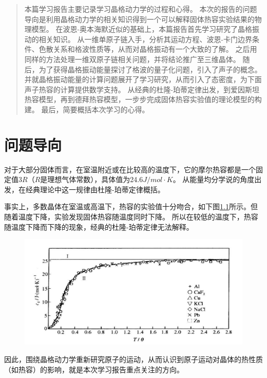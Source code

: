 \documentclass[declarePage]{ecnuthesis}
\begin{document}
\frontmatter

\begin{abstract}
本篇学习报告主要记录学习晶格动力学的过程和心得。
本次的报告的问题导向是利用晶格动力学的相关知识得到一个可以解释固体热容实验结果的物理模型。%
在波恩-奥本海默近似的基础上，本篇报告首先学习研究了晶格振动的相关知识。%
从一维单原子链入手，分析其运动方程、波恩-卡门边界条件、色散关系和格波性质等，从而对晶格振动有一个大致的了解。%
之后用同样的方法处理一维双原子链相关问题，并将结论推广至三维晶体。%
随后，为了获得晶格振动能量探讨了格波的量子化问题，引入了声子的概念。%
并就晶格振动能量的计算问题展开了学习研究，从而引入了态密度，为下面声子热容的计算提供数学支持。%
从经典的杜隆-珀蒂定律出发，到爱因斯坦热容模型，再到德拜热容模型，一步步完成固体热容实验值的理论模型的构建。%
最后，简要概括本次学习的心得。
\end{abstract}



\mainmatter

\chapter{问题导向} 

对于大部分固体而言，在室温附近或在比较高的温度下，它的摩尔热容都是一个固定值$3R$（$R$是理想气体常数），具体值为24.6$J/mol \cdot K$。%
从能量均分学说的角度出发，在经典理论中这一规律由杜隆-珀蒂定律概括。

事实上，多数晶体在室温或高温下，热容的实验值十分吻合，如下图\ref{HC}所示。但随着温度下降，实验发现固体热容随温度同时下降。%
所以在较低的温度下，热容随温度下降而下降的现象，经典的杜隆-珀蒂定律无法解释。
\begin{figure}[htb]
    \centering
    \includegraphics[width=.7\textwidth]{HC.png}
    \label{HC}
\end{figure}

因此，围绕晶格动力学重新研究原子的运动，从而认识到原子运动对晶体的热性质（如热容）的影响，就是本次学习报告重点关注的方向。
\end{document}
